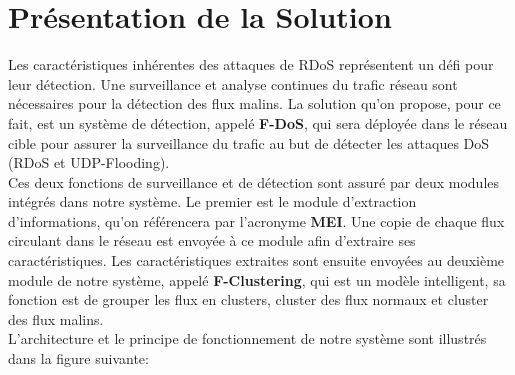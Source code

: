 \section{Présentation de la Solution}
Les caractéristiques inhérentes des attaques de RDoS représentent un défi pour leur détection. Une surveillance et analyse continues du trafic réseau sont nécessaires pour la détection des flux malins. La solution qu'on propose, pour ce fait, est un système de détection, appelé \textbf{F-DoS}, qui sera déployée dans le réseau cible pour assurer la surveillance du trafic au but de détecter les attaques DoS (RDoS et UDP-Flooding).\\

Ces deux fonctions de surveillance et de détection sont assuré par deux modules intégrés dans notre système. Le premier est le module d'extraction d'informations, qu'on référencera par l'acronyme \textbf{MEI}. Une copie de chaque flux circulant dans le réseau est envoyée à ce module afin d'extraire ses caractéristiques. Les caractéristiques extraites sont ensuite envoyées au deuxième module de notre système, appelé \textbf{F-Clustering}, qui est un modèle intelligent, sa fonction est de grouper les flux en clusters, cluster des flux normaux et cluster des flux malins.\\

L'architecture et le principe de fonctionnement de notre système sont illustrés dans la figure suivante: \\

